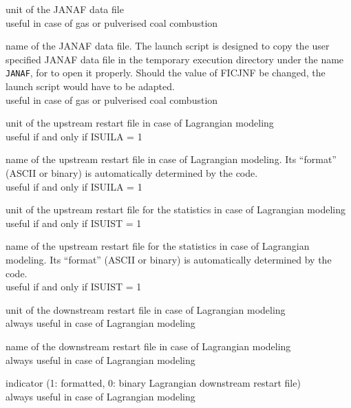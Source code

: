 {unit of the JANAF data file\\
useful in case of gas or pulverised coal combustion}

{name of the JANAF data file. The launch script is designed to copy the
user specified JANAF data file in the temporary execution directory
under the name \texttt{JANAF}, for \CS to open it properly. Should the value
of FICJNF be changed, the launch script would have to be adapted.\\
useful in case of gas or pulverised coal combustion}


{unit of the upstream restart file in case of Lagrangian modeling\\
useful if and only if ISUILA = 1}

{name of the upstream restart file in case of Lagrangian modeling.
Its ``format'' (ASCII or
binary) is automatically determined by the code.\\
useful if and only if ISUILA = 1}

{unit of the upstream restart file for the statistics in case of
Lagrangian modeling\\
useful if and only if ISUIST = 1}

{name of the upstream restart file for the statistics in case of
Lagrangian modeling. Its ``format'' (ASCII or
binary) is automatically determined by the code.\\
useful if and only if ISUIST = 1}

{unit of the downstream restart file in case of Lagrangian modeling\\
always useful in case of Lagrangian modeling}

{name of the downstream restart file in case of Lagrangian modeling\\
always useful in case of Lagrangian modeling}

{indicator (1: formatted, 0: binary Lagrangian downstream restart file)\\
always useful in case of Lagrangian modeling}


